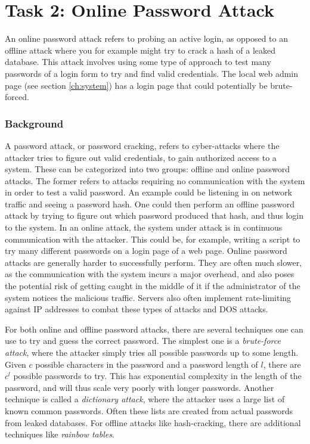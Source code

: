 \section{Task 2: Online Password Attack} \label{ch:pentesting:password}
An online password attack refers to probing an active login, as opposed to an offline attack where you for example might try to crack a hash of a leaked database. This attack involves using some type of approach to test many passwords of a login form to try and find valid credentials. The local web admin page (see section \ref{ch:system}) has a login page that could potentially be brute-forced.

\subsubsection{Background}
A password attack, or password cracking, refers to cyber-attacks where the attacker tries to figure out valid credentials, to gain authorized access to a system. These can be categorized into two groups: offline and online password attacks. The former refers to attacks requiring no communication with the system in order to test a valid password. An example could be listening in on network traffic and seeing a password hash. One could then perform an offline password attack by trying to figure out which password produced that hash, and thus login to the system. In an online attack, the system under attack is in continuous communication with the attacker. This could be, for example, writing a script to try many different passwords on a login page of a web page. Online password attacks are generally harder to successfully perform. They are often much slower, as the communication with the system incurs a major overhead, and also poses the potential risk of getting caught in the middle of it if the administrator of the system notices the malicious traffic. Servers also often implement rate-limiting against IP addresses to combat these types of attacks and DOS attacks.

For both online and offline password attacks, there are several techniques one can use to try and guess the correct password. The simplest one is a \textit{brute-force attack}, where the attacker simply tries all possible passwords up to some length. Given $c$ possible characters in the password and a password length of $l$, there are $c^l$ possible passwords to try. This has exponential complexity in the length of the password, and will thus scale very poorly with longer passwords. Another technique is called a \textit{dictionary attack}, where the attacker uses a large list of known common passwords. Often these lists are created from actual passwords from leaked databases. For offline attacks like hash-cracking, there are additional techniques like \textit{rainbow tables}.

